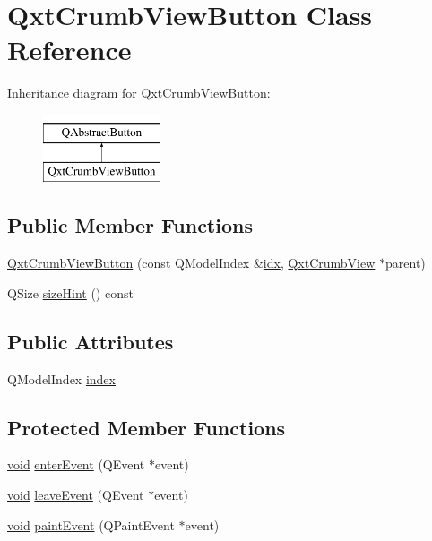 \hypertarget{class_qxt_crumb_view_button}{\section{Qxt\-Crumb\-View\-Button Class Reference}
\label{class_qxt_crumb_view_button}
}
Inheritance diagram for Qxt\-Crumb\-View\-Button\-:\begin{figure}[H]
\begin{center}
\leavevmode
\includegraphics[height=2.000000cm]{class_qxt_crumb_view_button}
\end{center}
\end{figure}
\subsection*{Public Member Functions}
\begin{DoxyCompactItemize}
\item 
\hyperlink{class_qxt_crumb_view_button_a5c87bd34fba0419ea8e3063c0e388f58}{Qxt\-Crumb\-View\-Button} (const Q\-Model\-Index \&\hyperlink{uavobjecttemplate_8m_a49654e4709f40aecccada266daa32fc6}{idx}, \hyperlink{class_qxt_crumb_view}{Qxt\-Crumb\-View} $\ast$parent)
\item 
Q\-Size \hyperlink{class_qxt_crumb_view_button_a8005313107201b5684675a91cb0fbc02}{size\-Hint} () const 
\end{DoxyCompactItemize}
\subsection*{Public Attributes}
\begin{DoxyCompactItemize}
\item 
Q\-Model\-Index \hyperlink{class_qxt_crumb_view_button_adcdd9b55e7bf206597860f1dbdc4c94b}{index}
\end{DoxyCompactItemize}
\subsection*{Protected Member Functions}
\begin{DoxyCompactItemize}
\item 
\hyperlink{group___u_a_v_objects_plugin_ga444cf2ff3f0ecbe028adce838d373f5c}{void} \hyperlink{class_qxt_crumb_view_button_a0bf57acaec14014cce390a427f88aabc}{enter\-Event} (Q\-Event $\ast$event)
\item 
\hyperlink{group___u_a_v_objects_plugin_ga444cf2ff3f0ecbe028adce838d373f5c}{void} \hyperlink{class_qxt_crumb_view_button_a6784a9f92ed2dc91faf30b7b6ef9b597}{leave\-Event} (Q\-Event $\ast$event)
\item 
\hyperlink{group___u_a_v_objects_plugin_ga444cf2ff3f0ecbe028adce838d373f5c}{void} \hyperlink{class_qxt_crumb_view_button_a6073bc119c922dac3b0602d1579d2e87}{paint\-Event} (Q\-Paint\-Event $\ast$event)
\end{DoxyCompactItemize}


